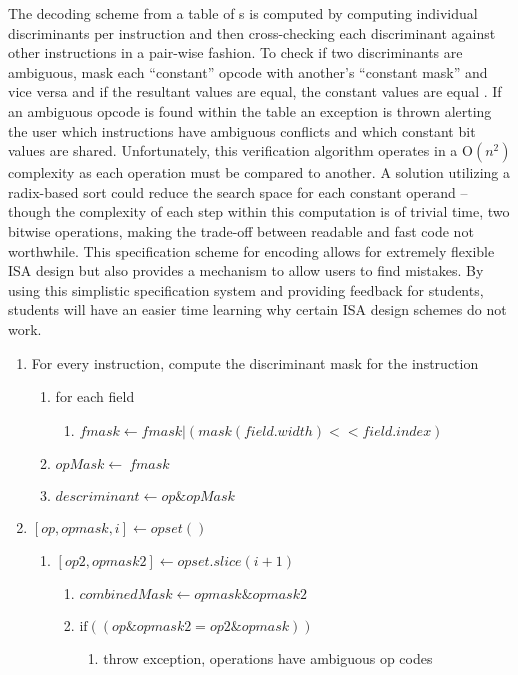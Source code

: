 The decoding scheme from a table of s is computed by computing individual discriminants per instruction and then cross-checking each discriminant against other instructions in a pair-wise fashion. To check if two discriminants are ambiguous, mask each ``constant'' opcode with another's ``constant mask'' and vice versa and if the resultant values are equal, the constant values are equal . If an ambiguous opcode is found within the  table an exception is thrown alerting the user which instructions have ambiguous conflicts and which constant bit values are shared. Unfortunately, this verification algorithm operates in a $\text{O}(n^2)$ complexity as each operation must be compared to another. A solution utilizing a radix-based sort could reduce the search space for each constant operand -- though the complexity of each step within this computation is of trivial time, two bitwise operations, making the trade-off between readable and fast code not worthwhile. This specification scheme for encoding allows for extremely flexible ISA design but also provides a mechanism to allow users to find mistakes. By using this simplistic specification system and providing feedback for students, students will have an easier time learning why certain ISA design schemes do not work. 

\begin{enumerate}
    \item For every instruction, compute the discriminant mask for the instruction
    \begin{enumerate}
        \item for each field
        \begin{enumerate}
            \item $fmask \leftarrow fmask | (mask(field.width) << field.index)$
        \end{enumerate}
        \item $opMask \leftarrow ~fmask$
        \item $descriminant \leftarrow op \text{\&} opMask$
    \end{enumerate}
    \item $[op, opmask, i] \leftarrow opset()$
    \begin{enumerate}
        \item $[op2, opmask2] \leftarrow opset.slice(i+1)$
        \begin{enumerate}
            \item $combinedMask \leftarrow opmask \text{\&} opmask2 $
            \item $\text{if} ((op \text{\&} opmask2 = op2 \text{\&} opmask))$
            \begin{enumerate}
                \item throw exception, operations have ambiguous op codes
            \end{enumerate}
        \end{enumerate}
    \end{enumerate}
\end{enumerate}

